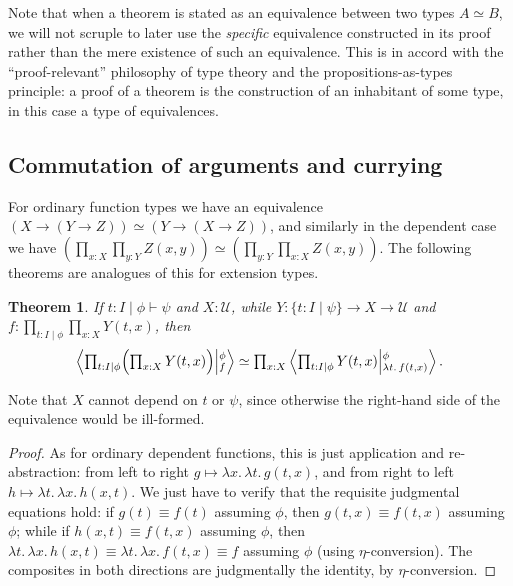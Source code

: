 \documentclass[12pt]{amsart}
\theoremstyle{plain}
\newtheorem{thm}{Theorem}[section]
\theoremstyle{definition}
\theoremstyle{remark}
\numberwithin{equation}{section}
\newcommand{\tprod}{\textstyle\prod}
\newcommand{\exten}[4]{\left\langle\mathchoice{\textstyle\prod_{#1}}{\textstyle\prod_{#1}}{\scriptstyle\prod_{#1}}{\scriptscriptstyle\prod_{#1}} #2 \middle|^{#3}_{#4}\right\rangle}
\newcommand{\jdeq}{\equiv}
\newcommand{\types}{\vdash}
\newcommand{\univtype}{\mathcal{U}}
\newcommand{\sh}[2]{\{#1\mid #2\}}
\newcommand{\lam}[1]{\lambda #1.\,}
\newcommand{\Parens}[1]{\Bigl(#1\Bigr)}
\begin{document}
Note that when a theorem is stated as an equivalence between two types $A \simeq B$, we will not scruple to later use the \emph{specific} equivalence constructed in its proof rather than the mere existence of such an equivalence.
  This is in accord with the ``proof-relevant'' philosophy of type theory and the propositions-as-types principle: a proof of a theorem is the construction of an inhabitant of some type, in this case a type of equivalences.


\subsection{Commutation of arguments and currying}
\label{sec:curry}

For ordinary function types we have an equivalence $(X\to (Y\to Z)) \simeq (Y\to (X\to Z))$, and similarly in the dependent case we have $\left(\prod_{x:X} \prod_{y:Y} Z(x,y)\right) \simeq \left(\prod_{y:Y} \prod_{x:X} Z(x,y)\right)$.
The following theorems are analogues of this for extension types.

\begin{thm}\label{thm:exten-prod-commute}
  If $t:I \mid \phi\types\psi$ and $X:\univtype$, while $Y:\sh{t:I}{\psi} \to X\to\univtype$ and $f:\prod_{t:I\mid\phi} \prod_{x:X} Y(t,x)$, then
  \[ \exten{t:I|\phi}{\Parens{\prod_{x:X} Y(t,x)}}{\phi}{f} \simeq
  \tprod_{x:X} \exten{t:I|\phi}{Y(t,x)}{\phi}{\lam{t}f(t,x)}.
  \]
\end{thm}
Note that $X$ cannot depend on $t$ or $\psi$, since otherwise the right-hand side of the equivalence would be ill-formed.
\begin{proof}
  As for ordinary dependent functions, this is just application and re-ab\-strac\-tion: from left to right $g\mapsto \lam{x} \lam{t} g(t,x)$, and from right to left $h \mapsto \lam{t}\lam{x} h(x,t)$.
  We just have to verify that the requisite judgmental equations hold: if $g(t)\jdeq f(t)$ assuming $\phi$, then $g(t,x)\jdeq f(t,x)$ assuming $\phi$; while if $h(x,t)\jdeq f(t,x)$ assuming $\phi$, then $\lam{t}\lam{x} h(x,t) \jdeq \lam{t}\lam{x}f(t,x) \jdeq f$ assuming $\phi$ (using $\eta$-conversion).
  The composites in both directions are judgmentally the identity, by $\eta$-conversion.
\end{proof}
\end{document}
